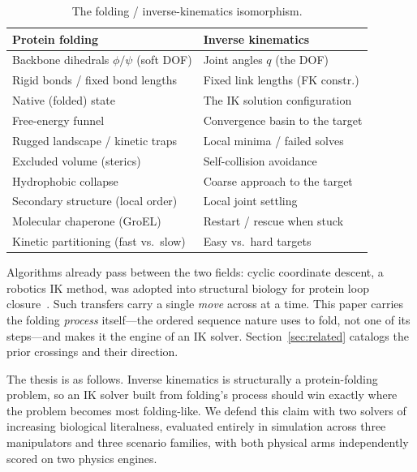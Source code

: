 \documentclass[10pt,conference]{IEEEtran}
\begin{document}
\begin{table}[t]
\centering
\caption{The folding / inverse-kinematics isomorphism.}
\label{tab:isomorphism}
\scriptsize
\setlength{\tabcolsep}{3pt}
\begin{tabular}{@{}ll@{}}
\toprule
\textbf{Protein folding} & \textbf{Inverse kinematics} \\
\midrule
Backbone dihedrals $\phi/\psi$ (soft DOF)   & Joint angles $q$ (the DOF) \\
Rigid bonds / fixed bond lengths            & Fixed link lengths (FK constr.) \\
Native (folded) state                       & The IK solution configuration \\
Free-energy funnel                          & Convergence basin to the target \\
Rugged landscape / kinetic traps            & Local minima / failed solves \\
Excluded volume (sterics)                   & Self-collision avoidance \\
Hydrophobic collapse                        & Coarse approach to the target \\
Secondary structure (local order)           & Local joint settling \\
Molecular chaperone (GroEL)                 & Restart / rescue when stuck \\
Kinetic partitioning (fast vs.\ slow)       & Easy vs.\ hard targets \\
\bottomrule
\end{tabular}
\end{table}

Algorithms already pass between the two fields: cyclic coordinate descent, a
robotics IK method, was adopted into structural biology for protein loop
closure~\cite{b1}. Such transfers carry a single \emph{move} across at a time.
This paper carries the folding \emph{process} itself---the ordered sequence
nature uses to fold, not one of its steps---and makes it the engine of an IK
solver. Section~\ref{sec:related} catalogs the prior crossings and their
direction.

The thesis is as follows. Inverse kinematics is structurally a protein-folding
problem, so an IK solver built from folding's process should win exactly where
the problem becomes most folding-like. We defend this claim with two solvers of
increasing biological literalness, evaluated entirely in simulation across three
manipulators and three scenario families, with both physical arms independently
scored on two physics engines.
\end{document}
